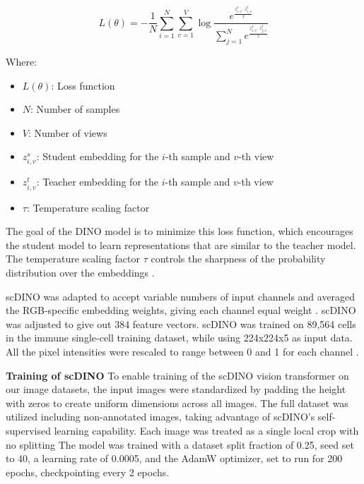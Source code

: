 \documentclass[12pt,a4paper]{article}
\begin{document}
$$
L(\theta) = -\frac{1}{N} \sum_{i=1}^{N} \sum_{v=1}^{V} \log \frac{e^{\frac{z_{i,v}^s \cdot z_{i,v}^t}{\tau}}}{\sum_{j=1}^{N} e^{\frac{z_{i,v}^s \cdot z_{j,v}^t}{\tau}}}
$$

Where:
\begin{itemize}
\item $L(\theta)$: Loss function
\item $N$: Number of samples
\item $V$: Number of views
\item $z_{i,v}^s$: Student embedding for the $i$-th sample and $v$-th view
\item $z_{i,v}^t$: Teacher embedding for the $i$-th sample and $v$-th view
\item $\tau$: Temperature scaling factor
\end{itemize}

The goal of the DINO model is to minimize this loss function, which encourages the student model to learn representations that are similar to the teacher model. The temperature scaling factor $\tau$ controls the sharpness of the probability distribution over the embeddings \cite{Pfaendler2023.01.16.524226}.

scDINO was adapted to accept variable numbers of input channels and averaged the RGB-specific embedding weights, giving each channel equal weight \cite{Pfaendler2023.01.16.524226}. scDINO was adjusted to give out 384 feature vectors. scDINO was trained on 89,564 cells in the immune single-cell training dataset, while using 224x224x5 as input data. All the pixel intensities were rescaled to range between 0 and 1 for each channel \cite{Pfaendler2023.01.16.524226}.

\textbf{Training of scDINO}
To enable training of the scDINO vision transformer on our image datasets, the input images were standardized by padding the height with zeros to create uniform dimensions across all images. The full dataset was utilized including non-annotated images, taking advantage of scDINO's self-supervised learning capability. Each image was treated as a single local crop with no splitting The model was trained with a dataset split fraction of 0.25, seed set to 40, a learning rate of 0.0005, and the AdamW optimizer, set to run for 200 epochs, checkpointing every 2 epochs.
\end{document}
